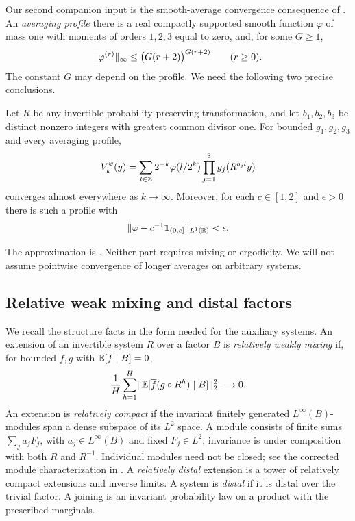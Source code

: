 Our second companion input is the smooth-average convergence consequence
of \cite[Proposition~3.5 and Lemma~3.6]{SlopesCompanion}.
An \emph{averaging profile} there is a real compactly supported smooth
function $\varphi$ of mass one with moments of orders $1,2,3$ equal to
zero, and, for some $G\ge1$,
\[
 \lVert\varphi^{(r)}\rVert_\infty
 \le \bigl(G(r+2)\bigr)^{G(r+2)}\qquad(r\ge0).
\]
The constant $G$ may depend on the profile. We need the following
two precise conclusions.
\begin{proposition}
\label{prop:smooth-input}
Let $R$ be any invertible probability-preserving transformation, and
let $b_1,b_2,b_3$ be distinct nonzero integers with greatest common
divisor one. For bounded $g_1,g_2,g_3$ and every averaging profile,
\[
 V_k^\varphi(y)=\sum_{l\in\mathbb Z}2^{-k}\varphi(l/2^k)
              \prod_{j=1}^3g_j(R^{b_jl}y)
\]
converges almost everywhere as $k\to\infty$. Moreover, for each
$c\in[1,2]$ and $\epsilon>0$ there is such a profile with
\[
 \lVert\varphi-c^{-1}\mathbf1_{(0,c]}\rVert_{L^1(\mathbb R)}<\epsilon.
\]
\end{proposition}
The approximation is \cite[Lemma~3.9]{SlopesCompanion}. Neither part
requires mixing or ergodicity. We will not assume pointwise convergence
of longer averages on arbitrary systems.

\subsection{Relative weak mixing and distal factors}

We recall the structure facts in the form needed for the auxiliary
systems. An extension of an invertible system $R$ over a factor $B$
is \emph{relatively weakly mixing} if, for bounded $f,g$ with
$\mathbb E[f\mid B]=0$,
\begin{equation}\label{eq:rwm}
 \frac1H\sum_{h=1}^H
 \lVert\mathbb E[\overline f(g\circ R^h)\mid B]\rVert_2^2\longrightarrow0.
\end{equation}
An extension is \emph{relatively compact} if the invariant finitely
generated $L^\infty(B)$-modules span a dense subspace of its $L^2$
space. A module consists of finite sums $\sum_j a_jF_j$, with
$a_j\in L^\infty(B)$ and fixed $F_j\in L^2$; invariance is under
composition with both $R$ and $R^{-1}$. Individual modules need not be
closed; see the corrected module characterization in
\cite[Theorem~2.5(ii)$'$]{JamneshanCorrigendum2026}.
A \emph{relatively distal} extension is a tower of relatively
compact extensions and inverse limits. A system is \emph{distal} if
it is distal over the trivial factor. A joining is an invariant
probability law on a product with the prescribed marginals.

